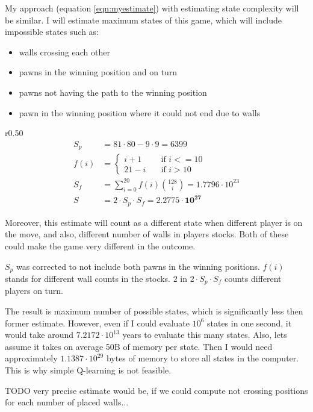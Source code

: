 My approach (equation \ref{eqn:myestimate}) with estimating state complexity
will be similar. I will estimate maximum states of this game, which will
include impossible states such as:
\begin{itemize}
  \vspace*{-0.25cm}
  \setlength\itemsep{0cm}
  \item walls crossing each other
  \item pawns in the winning position and on turn
  \item pawns not having the path to the winning position
  \item pawn in the winning position where it could not end due to walls
  \vspace*{-0.15cm}
\end{itemize}
\begin{wrapfigure}{r}{0.50\textwidth}
  \vspace*{-1.90cm}
  \begin{equation}
    \label{eqn:myestimate}
    \begin{aligned}
      S_p &= 81 {\cdot} 80 - 9 {\cdot} 9 = 6399\\[-0.20cm]
      f(i)\!&=\! \begin{cases}
        i + 1  & \quad \text{if } i <= 10 \\[-0.30cm]
        21 - i & \quad \text{if } i > 10
      \end{cases}\\
      S_f\! &=\! \sum_{i=0}^{20} f(i){128 \choose i} = 1.7796 {\cdot} 10^{23}
      \\
      S &= 2 {\cdot} S_p {\cdot} S_f = \mathbf{2.2775 {\cdot} 10^{27}}
    \end{aligned}
  \end{equation}
  \vspace*{-1.15cm}
\end{wrapfigure}
Moreover, this estimate will count as a different state when different
player is on the move, and also, different number of walls in players
stocks. Both of these could make the game very different in the outcome.

$S_p$ was corrected to not include both pawns in the winning positions.
$f(i)$ %
stands for different wall counts in the stocks.
$2$ in $2{\cdot} S_p {\cdot} S_f$ counts different players on turn.

The result is maximum number of possible states, which is significantly
less then former estimate. However, even if I could evaluate $10^{6}$
states in one second, it would take around $7.2172{\cdot}10^{13}$ years to
evaluate this many states. Also, lets assume it takes on average 50B
of memory per state. Then I would need approximately
$1.1387{\cdot}10^{29}$ bytes of memory to store all states in the
computer. This is why simple Q-learning is not feasible.

TODO very precise estimate would be, if we could compute not crossing
positions for each number of placed walls...
